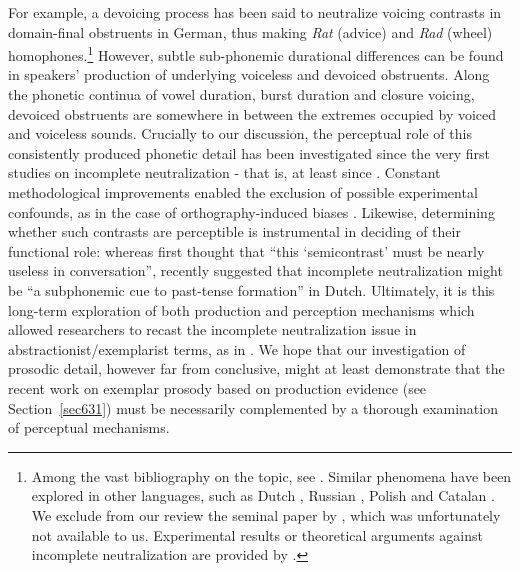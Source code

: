 For example, a devoicing process has been said to neutralize voicing contrasts in domain-final obstruents in German, thus making \textit{Rat} (advice) and \textit{Rad} (wheel) homophones.\footnote{Among the vast bibliography on the topic, see \citet{port1981neutralization,odell1983discrimination,charlesluce1985word,port1985neutralization,port1989incomplete,port1996discreteness,kleber2010implications,rottger2011robustness,winterFORTHnature}. Similar phenomena have been explored in other languages, such as Dutch \citep{warner2004incomplete,warner2006orthographic,ernestus2006functionality}, Russian \citep{pye1986word,dmitrieva2010phonological}, Polish \citep{slowiaczek1985neutralizing,slowiaczek1989perception} and Catalan \citep{dinnsen1984phonological,charlesluce1987reanalysis}. We exclude from our review the seminal paper by \citet{dinnsen1971three}, which was unfortunately not available to us. Experimental results or theoretical arguments against incomplete neutralization are provided by \citet{fourakis1984incomplete,mascaro1987underlying,jassem1989neutralization,kopkalli1993phonetic,manaster1996letter}.} However, subtle sub-phonemic durational differences can be found in speakers' production of underlying voiceless and devoiced obstruents. Along the phonetic continua of vowel duration, burst duration and closure voicing, devoiced obstruents are somewhere in between the extremes occupied by voiced and voiceless sounds. Crucially to our discussion, the perceptual role of this consistently produced phonetic detail has been investigated since the very first studies on incomplete neutralization - that is, at least since \citet{port1981neutralization}. Constant methodological improvements enabled the exclusion of possible experimental confounds, as in the case of orthography-induced biases \citep{rottger2011robustness}. Likewise, determining whether such contrasts are perceptible is instrumental in deciding of their functional role: whereas \citet{port1981neutralization} first thought that ``this `semicontrast' must be nearly useless in conversation'', \citet{ernestus2006functionality} recently suggested that incomplete neutralization might be ``a subphonemic cue to past-tense formation'' in Dutch. Ultimately, it is this long-term exploration of both production and perception mechanisms which allowed researchers to recast the incomplete neutralization issue in abstractionist/exemplarist terms, as in \citet{kleber2010implications}. We hope that our investigation of prosodic detail, however far from conclusive, might at least demonstrate that the recent work on exemplar prosody based on production evidence (see Section~\ref{sec631}) must be necessarily complemented by a thorough examination of perceptual mechanisms.

